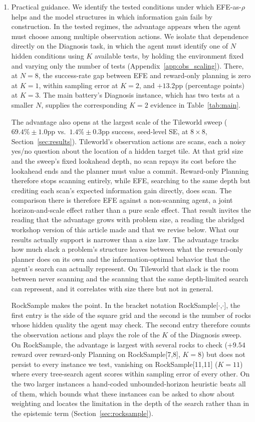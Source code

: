 \begin{enumerate}
    \item Practical guidance. We identify the tested conditions under which EFE-as-$\rho$ helps and the model structures in which information gain fails by construction. In the tested regimes, the advantage appears when the agent must choose among multiple observation actions. We isolate that dependence directly on the Diagnosis task, in which the agent must identify one of $N$ hidden conditions using $K$ available tests, by holding the environment fixed and varying only the number of tests (Appendix~\ref{app:obs_scaling}). There, at $N{=}8$, the success-rate gap between EFE and reward-only planning is zero at $K{=}1$, within sampling error at $K{=}2$, and $+13.2$pp (percentage points) at $K{=}3$. The main battery's Diagnosis instance, which has two tests at a smaller $N$, supplies the corresponding $K{=}2$ evidence in Table~\ref{tab:main}.

    The advantage also opens at the largest scale of the Tileworld sweep ($69.4\% \pm 1.0$pp vs.\ $1.4\% \pm 0.3$pp success, seed-level SE, at $8{\times}8$, Section~\ref{sec:results}). Tileworld's observation actions are scans, each a noisy yes/no question about the location of a hidden target tile. At that grid size and the sweep's fixed lookahead depth, no scan repays its cost before the lookahead ends and the planner must value a commit. Reward-only Planning therefore stops scanning entirely, while EFE, searching to the same depth but crediting each scan's expected information gain directly, does scan. The comparison there is therefore EFE against a non-scanning agent, a joint horizon-and-scale effect rather than a pure scale effect. That result invites the reading that the advantage grows with problem size, a reading the abridged workshop version of this article made and that we revise below. What our results actually support is narrower than a size law. The advantage tracks how much slack a problem's structure leaves between what the reward-only planner does on its own and the information-optimal behavior that the agent's search can actually represent. On Tileworld that slack is the room between never scanning and the scanning that the same depth-limited search can represent, and it correlates with size there but not in general.

    RockSample makes the point. In the bracket notation RockSample[$\cdot$,$\cdot$], the first entry is the side of the square grid and the second is the number of rocks whose hidden quality the agent may check. The second entry therefore counts the observation actions and plays the role of the $K$ of the Diagnosis sweep. On RockSample, the advantage is largest with several rocks to check ($+9.54$ reward over reward-only Planning on RockSample[7,8], $K{=}8$) but does not persist to every instance we test, vanishing on RockSample[11,11] ($K{=}11$) where every tree-search agent scores within sampling error of every other. On the two larger instances a hand-coded unbounded-horizon heuristic beats all of them, which bounds what these instances can be asked to show about weighting and locates the limitation in the depth of the search rather than in the epistemic term (Section~\ref{sec:rocksample}).


\end{enumerate}
